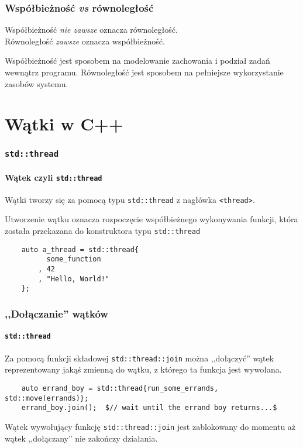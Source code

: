 \documentclass[aspectratio=169]{beamer}
\begin{document}
\begin{frame}
    \frametitle{Współbieżność \emph{vs} równoległość}

    Współbieżność \emph{nie zawsze} oznacza równoległość.\\
    Równoległość \emph{zawsze} oznacza współbieżność.

    \vspace{1em}

    Współbieżność jest sposobem na modelowanie zachowania i podział zadań
    wewnątrz programu. Równoległość jest sposobem na pełniejsze wykorzystanie
    zasobów systemu.
\end{frame}

\section{Wątki w C++}

\begin{frame}[fragile]
    \frametitle{\texttt{std::thread}}
    \framesubtitle{Wątek czyli \texttt{std::thread}}

    Wątki tworzy się za pomocą typu \texttt{std::thread} z nagłówka
    \texttt{<thread>}.

    \vspace{1em}

    Utworzenie wątku oznacza rozpoczęcie współbieżnego wykonywania funkcji,
    która została przekazana do konstruktora typu \texttt{std::thread}
    {\small
    \begin{lstlisting}
    auto a_thread = std::thread{
          some_function
        , 42
        , "Hello, World!"
    };
    \end{lstlisting}}
\end{frame}

\begin{frame}[fragile]
    \frametitle{,,Dołączanie'' wątków}
    \framesubtitle{\texttt{std::thread}}

    Za pomocą funkcji składowej \texttt{std::thread::join} można ,,dołączyć''
    wątek reprezentowany jakąś zmienną do wątku, z którego ta funkcja jest
    wywołana.

    \vspace{1em}

    {\scriptsize
    \begin{lstlisting}
    auto errand_boy = std::thread{run_some_errands, std::move(errands)};
    errand_boy.join();  $// wait until the errand boy returns...$
    \end{lstlisting}}

    \vspace{1em}

    Wątek wywołujący funkcję \texttt{std::thread::join} jest zablokowany do
    momentu aż wątek ,,dołączany'' nie zakończy działania.
\end{frame}
\end{document}

